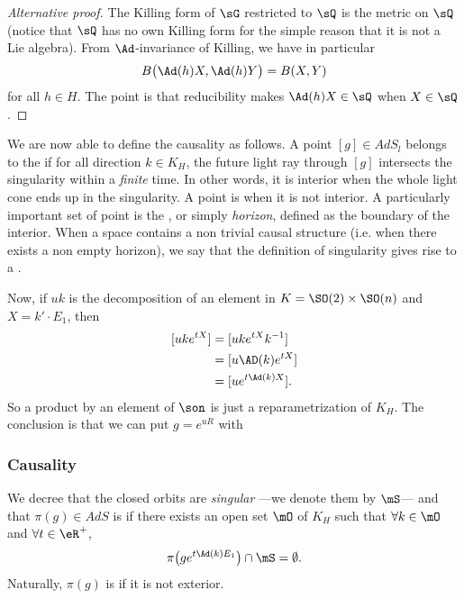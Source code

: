 \begin{proof}[Alternative proof]
The Killing form of $\sG$ restricted to $\sQ$ is the metric on $\sQ$ (notice that $\sQ$ has no own Killing form for the simple reason that it is not a Lie algebra). From $\Ad$-invariance of Killing, we have in particular
\[ 
  B\big( \Ad(h)X,\Ad(h)Y \big)=B(X,Y)
\]
for all $h\in H$. The point is that reducibility makes $\Ad(h)X\in\sQ$ when $X\in\sQ$.
\end{proof}

We are now able to define the causality as follows.  A point $[g]\in AdS_l$ belongs to the  if for all direction $k\in K_H$, the future light ray through $[g]$ intersects the singularity within a \emph{finite} time.  In other words, it is interior when the whole light cone ends up in the singularity.  A point is  when it is not interior.  A particularly important set of point is the , or simply \emph{horizon}, defined as the boundary of the interior. When a space contains a non trivial causal structure (i.e. when there exists a non empty horizon), we say that the definition of singularity gives rise to a .  

Now, if $uk$ is the decomposition of an element in $K=\SO(2)\times \SO(n)$ and $X=k'\cdot E_1$, then
\begin{equation}
\begin{split}
[uke^{tX}]&=[uke^{tX}k^{-1}]\\
          &=[u\AD(k)e^{tX}]\\
          &=[ue^{t\Ad(k)X}].
\end{split}
\end{equation}
So a product by an element of $\son$ is just a reparametrization of $K_H$. The conclusion is that we can put $g=e^{uR}$ with

\subsubsection{Causality}

We decree that the closed orbits are \emph{singular} ---we denote them by $\mS$--- and that $\pi(g)\in AdS$ is  if there exists an open set $\mO$ of $K_H$ such that $\forall k\in\mO$ and $\forall t\in\eR^+$,
\[
  \pi\big( g e^{t\Ad(k)E_1}  \big)\cap\mS=\emptyset.
\]
Naturally, $\pi(g)$ is  if it is not exterior. 

